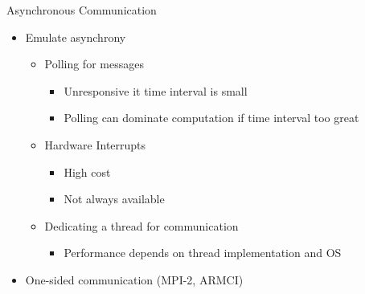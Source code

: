 \documentclass[svgnames]{beamer}
\begin{document}
\begin{frame}{Asynchronous Communication}
\begin{itemize}
	\item Emulate asynchrony
	\begin{itemize}
		\item Polling for messages
		\begin{itemize}
			\item Unresponsive it time interval is small
			\item Polling can dominate computation if time interval too great
		\end{itemize}
		\item Hardware Interrupts
		\begin{itemize}
			\item High cost
			\item Not always available
		\end{itemize}
		\item Dedicating a thread for communication
		\begin{itemize}
			\item Performance depends on thread implementation and OS
		\end{itemize}
	\end{itemize}
	\item<2-> One-sided communication (MPI-2, ARMCI)
\end{itemize}
\end{frame}
\end{document}
